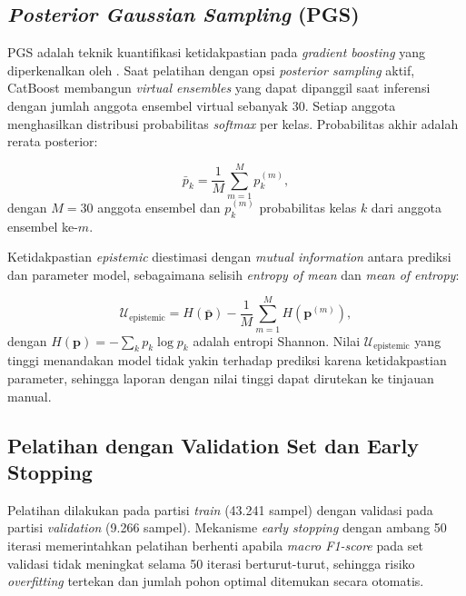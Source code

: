 \subsection{\textit{Posterior Gaussian Sampling} (PGS)}

PGS adalah teknik kuantifikasi ketidakpastian pada \textit{gradient boosting} yang diperkenalkan oleh \citet{ustimenkoCatBoostUncertainty2023}. Saat pelatihan dengan opsi \textit{posterior sampling} aktif, CatBoost membangun \textit{virtual ensembles} yang dapat dipanggil saat inferensi dengan jumlah anggota ensembel virtual sebanyak 30. Setiap anggota menghasilkan distribusi probabilitas \textit{softmax} per kelas. Probabilitas akhir adalah rerata posterior:

\begin{equation}
    \bar{p}_k = \frac{1}{M} \sum_{m=1}^{M} p_k^{(m)},
    \label{eq:pgs-mean}
\end{equation}
dengan $M = 30$ anggota ensembel dan $p_k^{(m)}$ probabilitas kelas $k$ dari anggota ensembel ke-$m$.

Ketidakpastian \textit{epistemic} diestimasi dengan \textit{mutual information} antara prediksi dan parameter model, sebagaimana selisih \textit{entropy of mean} dan \textit{mean of entropy}:

\begin{equation}
    \mathcal{U}_{\text{epistemic}} = H(\bar{\mathbf{p}}) - \frac{1}{M} \sum_{m=1}^{M} H(\mathbf{p}^{(m)}),
    \label{eq:pgs-mi}
\end{equation}
dengan $H(\mathbf{p}) = -\sum_k p_k \log p_k$ adalah entropi Shannon. Nilai $\mathcal{U}_{\text{epistemic}}$ yang tinggi menandakan model tidak yakin terhadap prediksi karena ketidakpastian parameter, sehingga laporan dengan nilai tinggi dapat dirutekan ke tinjauan manual.

\subsection{Pelatihan dengan Validation Set dan Early Stopping}

Pelatihan dilakukan pada partisi \textit{train} (43.241 sampel) dengan validasi pada partisi \textit{validation} (9.266 sampel). Mekanisme \textit{early stopping} dengan ambang 50 iterasi memerintahkan pelatihan berhenti apabila \textit{macro F1-score} pada set validasi tidak meningkat selama 50 iterasi berturut-turut, sehingga risiko \textit{overfitting} tertekan dan jumlah pohon optimal ditemukan secara otomatis.


